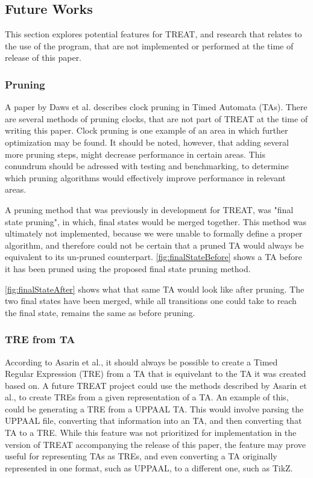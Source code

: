 \subsection{Future Works}\label{subsec:futureWorks}
This section explores potential features for TREAT, and research that relates to the use of the program, that are not implemented or performed at the time of release of this paper.

\subsubsection{Pruning}\label{futureWorks:pruning}
A paper by Daws et al. \cite{Daws1996} describes clock pruning in Timed Automata (TAs). There are several methods of pruning clocks, that are not part of TREAT at the time of writing this paper.
Clock pruning is one example of an area in which further optimization may be found. It should be noted, however, that adding several more pruning steps, might decrease performance in certain areas.
This conundrum should be adressed with testing and benchmarking, to determine which pruning algorithms would effectively improve performance in relevant areas.

A pruning method that was previously in development for TREAT, was "final state pruning", in which, final states would be merged together. This method was ultimately not implemented, because we were unable to formally define a proper algorithm, and therefore could not be certain that a pruned TA would always be equivalent to its un-pruned counterpart.
\cref{fig:finalStateBefore} shows a TA before it has been pruned using the proposed final state pruning method.



\cref{fig:finalStateAfter} shows what that same TA would look like after pruning. The two final states have been merged, while all transitions one could take to reach the final state, remains the same as before pruning.




\subsubsection{TRE from TA}
According to Asarin et al.\cite{Eugene2001}, it should always be possible to create a Timed Regular Expression (TRE) from a TA that is equivelant to the TA it was created based on.
A future TREAT project could use the methods described by Asarin et al., to create TREs from a given representation of a TA. An example of this, could be generating a TRE from a UPPAAL TA.
This would involve parsing the UPPAAL file, converting that information into an TA, and then converting that TA to a TRE.
While this feature was not prioritized for implementation in the version of TREAT accompanying the release of this paper, the feature may prove useful for representing TAs as TREs, and even converting a TA originally represented in one format, such as UPPAAL, to a different one, such as TikZ.

